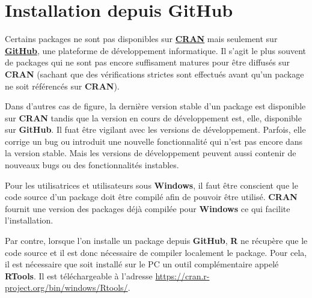 \documentclass[
  letterpaper,
  DIV=11,
  numbers=noendperiod,
  oneside]{scrreprt}
\begin{document}
\hypertarget{installation-depuis-github}{%
\section{Installation depuis GitHub}\label{installation-depuis-github}}

Certains packages ne sont pas disponibles sur
\href{https://cran.r-project.org/}{\textbf{CRAN}} mais seulement sur
\href{https://github.com/}{\textbf{GitHub}}, une plateforme de
développement informatique. Il s'agit le plus souvent de packages qui ne
sont pas encore suffisament matures pour être diffusés sur \textbf{CRAN}
(sachant que des vérifications strictes sont effectués avant qu'un
package ne soit référencés sur \textbf{CRAN}).

Dans d'autres cas de figure, la dernière version stable d'un package est
disponible sur \textbf{CRAN} tandis que la version en cours de
développement est, elle, disponible sur \textbf{GitHub}. Il fuat être
vigilant avec les versions de développement. Parfois, elle corrige un
bug ou introduit une nouvelle fonctionnalité qui n'est pas encore dans
la version stable. Mais les versions de développement peuvent aussi
contenir de nouveaux bugs ou des fonctionnalités instables.

\begin{tcolorbox}[enhanced jigsaw, colbacktitle=quarto-callout-warning-color!10!white, opacityback=0, toprule=.15mm, colback=white, coltitle=black, bottomtitle=1mm, toptitle=1mm, titlerule=0mm, rightrule=.15mm, title=\textcolor{quarto-callout-warning-color}{\faExclamationTriangle}\hspace{0.5em}{Sous Windows}, breakable, bottomrule=.15mm, opacitybacktitle=0.6, arc=.35mm, left=2mm, leftrule=.75mm, colframe=quarto-callout-warning-color-frame]

Pour les utilisatrices et utilisateurs sous \textbf{Windows}, il faut
être conscient que le code source d'un package doit être compilé afin de
pouvoir être utilisé. \textbf{CRAN} fournit une version des packages
déjà compilée pour \textbf{Windows} ce qui facilite l'installation.

Par contre, lorsque l'on installe un package depuis \textbf{GitHub},
\textbf{R} ne récupère que le code source et il est donc nécessaire de
compiler localement le package. Pour cela, il est nécessaire que soit
installé sur le PC un outil complémentaire appelé \textbf{RTools}. Il
est téléchargeable à l'adresse
\url{https://cran.r-project.org/bin/windows/Rtools/}.

\end{tcolorbox}
\end{document}
